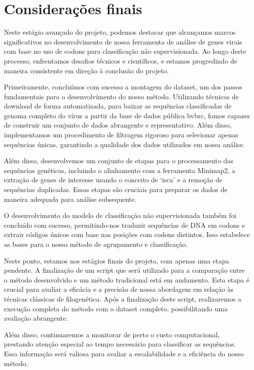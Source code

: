 \chapter{Considerações finais}

Neste estágio avançado do projeto, podemos destacar que alcançamos marcos significativos no desenvolvimento de nossa ferramenta de análise de genes virais com base no uso de codons para classificação não supervisionada. Ao longo deste processo, enfrentamos desafios técnicos e científicos, e estamos progredindo de maneira consistente em direção à conclusão do projeto.

Primeiramente, concluímos com sucesso a montagem do dataset, um dos passos fundamentais para o desenvolvimento do nosso método. Utilizando técnicas de download de forma automatizada, para baixar as sequências classificadas de genoma completo do vírus a partir da base de dados pública \gls{bvbrc}, fomos capazes de construir um conjunto de dados abrangente e representativo. Além disso, implementamos um procedimento de filtragem rigoroso para selecionar apenas sequências únicas, garantindo a qualidade dos dados utilizados em nossa análise.

Além disso, desenvolvemos um conjunto de etapas para o processamento das sequências genéticas, incluindo o alinhamento com a ferramenta Minimap2, a extração de genes de interesse usando o conceito de `isca' e a remoção de sequências duplicadas. Essas etapas são cruciais para preparar os dados de maneira adequada para análise subsequente.

O desenvolvimento do modelo de classificação não supervisionada também foi concluído com sucesso, permitindo-nos traduzir sequências de DNA em codons e extrair códigos únicos com base nas posições com codons distintos. Isso estabelece as bases para o nosso método de agrupamento e classificação.

Neste ponto, estamos nos estágios finais do projeto, com apenas uma etapa pendente. A finalização de um script que será utilizado para a comparação entre o método desenvolvido e um método tradicional está em andamento. Esta etapa é crucial para avaliar a eficácia e a precisão de nossa abordagem em relação às técnicas clássicas de filogenética. Após a finalização deste script, realizaremos a execução completa do método com o dataset completo, possibilitando uma avaliação abrangente.

Além disso, continuaremos a monitorar de perto o custo computacional, prestando atenção especial ao tempo necessário para classificar as sequências. Essa informação será valiosa para avaliar a escalabilidade e a eficiência do nosso método.

